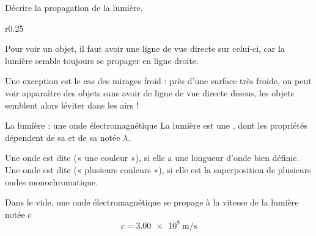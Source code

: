 \tetePremStssVisi
{}

\begin{objectifs}
  \item Décrire la propagation de la lumière.
\end{objectifs}

\begin{contexte}
  \vspace*{-14pt}
  \begin{wrapfigure}[6]{r}{0.25\linewidth}
    \centering \vspace*{-16pt}
  \end{wrapfigure}
  
  Pour voir un objet, il faut avoir une ligne de vue directe sur celui-ci, car la lumière semble toujours se propager en ligne droite.
  
  Une exception est le cas des mirages froid : près d'une surface très froide, on peut voir apparaître des objets sans avoir de ligne de vue directe dessus, les objets semblent alors léviter dans les airs !
  
\end{contexte}


\begin{doc}{La lumière : une onde électromagnétique}
  La lumière est une , dont les propriétés dépendent de sa  et de sa  notée $\lambda$.
  
  \begin{importants}
    Une onde est dite  (« une couleur »), si elle a une longueur d'onde bien définie.
    Une onde est dite  (« plusieurs couleurs »), si elle est la superposition de plusieurs ondes monochromatique.
  \end{importants}
  
  \begin{importants}
    Dans le vide, une onde électromagnétique se propage à la vitesse de la lumière notée $c$
    \begin{equation*}
      c = \qty{3,00e8}{\m\per\s}
    \end{equation*}
  \end{importants}
\end{doc}

